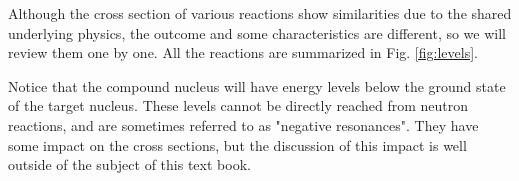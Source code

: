 Although the cross section of various reactions show similarities due to the shared underlying physics, the outcome and some characteristics are different, so we will review them one by one. All the reactions are summarized in Fig. \ref{fig:levels}.

Notice that the compound nucleus will have energy levels below the ground state of the target nucleus. These levels cannot be directly reached from neutron reactions, and are sometimes referred to as "negative resonances". They have some impact on the cross sections, but the discussion of this impact is well outside of the subject of this text book.

\begin{figure}[ht!]
\protect {}\protect

\end{figure}
